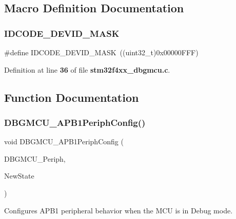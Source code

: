 \subsection{Macro Definition Documentation}
\mbox{\label{group__DBGMCU_gaeeece10cca80f3c632d3d77c3f2917b6}} 
\subsubsection{I\+D\+C\+O\+D\+E\+\_\+\+D\+E\+V\+I\+D\+\_\+\+M\+A\+SK}
{\footnotesize\ttfamily \#define I\+D\+C\+O\+D\+E\+\_\+\+D\+E\+V\+I\+D\+\_\+\+M\+A\+SK~((uint32\+\_\+t)0x00000\+F\+F\+F)}



Definition at line \textbf{ 36} of file \textbf{ stm32f4xx\+\_\+dbgmcu.\+c}.



\subsection{Function Documentation}
\mbox{\label{group__DBGMCU_ga71349f1435471f71979c742360df88f0}} 
\subsubsection{D\+B\+G\+M\+C\+U\+\_\+\+A\+P\+B1\+Periph\+Config()}
{\footnotesize\ttfamily void D\+B\+G\+M\+C\+U\+\_\+\+A\+P\+B1\+Periph\+Config (\begin{DoxyParamCaption}\item[{uint32\+\_\+t}]{D\+B\+G\+M\+C\+U\+\_\+\+Periph,  }\item[{\textbf{ Functional\+State}}]{New\+State }\end{DoxyParamCaption})}



Configures A\+P\+B1 peripheral behavior when the M\+CU is in Debug mode. 


